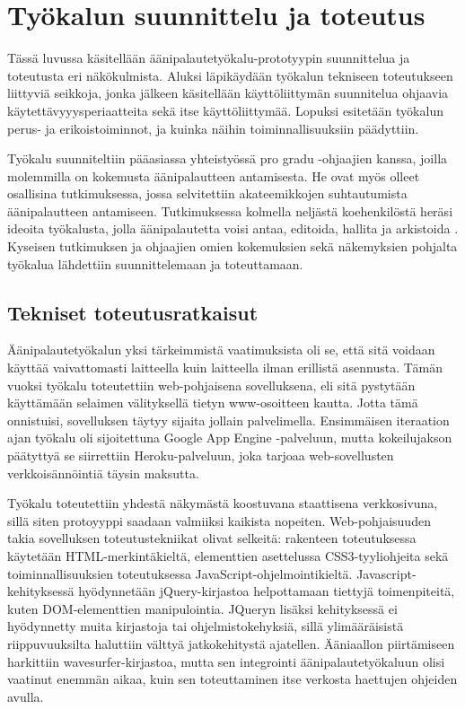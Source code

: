 \documentclass[utf8]{gradu3}
\begin{document}
\chapter{Työkalun suunnittelu ja toteutus}

Tässä luvussa käsitellään äänipalautetyökalu-prototyypin suunnittelua ja toteutusta eri näkökulmista. Aluksi läpikäydään työkalun tekniseen toteutukseen liittyviä seikkoja, jonka jälkeen käsitellään käyttöliittymän suunnitelua ohjaavia käytettävyyysperiaatteita sekä itse käyttöliittymää. Lopuksi esitetään työkalun perus- ja erikoistoiminnot, ja kuinka näihin toiminnallisuuksiin päädyttiin.

Työkalu suunniteltiin pääasiassa yhteistyössä pro gradu -ohjaajien kanssa, joilla molemmilla on kokemusta äänipalautteen antamisesta. He ovat myös olleet osallisina tutkimuksessa, jossa selvitettiin akateemikkojen suhtautumista äänipalautteen antamiseen. Tutkimuksessa kolmella neljästä koehenkilöstä heräsi ideoita työkalusta, jolla äänipalautetta voisi antaa, editoida, hallita ja arkistoida \parencite[][]{academics}. Kyseisen tutkimuksen ja ohjaajien omien kokemuksien sekä näkemyksien pohjalta työkalua lähdettiin suunnittelemaan ja toteuttamaan.

\section{Tekniset toteutusratkaisut}

Äänipalautetyökalun yksi tärkeimmistä vaatimuksista oli se, että sitä voidaan käyttää vaivattomasti laitteella kuin laitteella ilman erillistä asennusta. Tämän vuoksi työkalu toteutettiin web-pohjaisena sovelluksena, eli sitä pystytään käyttämään selaimen välityksellä tietyn www-osoitteen kautta. Jotta tämä onnistuisi, sovelluksen täytyy sijaita jollain palvelimella. Ensimmäisen iteraation ajan työkalu oli sijoitettuna Google App Engine -palveluun, mutta kokeilujakson päätyttyä se siirrettiin Heroku-palveluun, joka tarjoaa web-sovellusten verkkoisännöintiä täysin maksutta. 

Työkalu toteutettiin yhdestä näkymästä koostuvana staattisena verkkosivuna, sillä siten protoyyppi saadaan valmiiksi kaikista nopeiten. Web-pohjaisuuden takia sovelluksen toteutustekniikat olivat selkeitä: rakenteen toteutuksessa käytetään HTML-merkintäkieltä, elementtien asettelussa CSS3-tyyliohjeita sekä toiminnallisuuksien toteutuksessa JavaScript-ohjelmointikieltä. Javascript-kehityksessä hyödynnetään jQuery-kirjastoa helpottamaan tiettyjä toimenpiteitä, kuten DOM-elementtien manipulointia. JQueryn lisäksi kehityksessä ei hyödynnetty muita kirjastoja tai ohjelmistokehyksiä, sillä ylimääräisistä riippuvuuksilta haluttiin välttyä jatkokehitystä ajatellen. Ääniaallon piirtämiseen harkittiin wavesurfer-kirjastoa, mutta sen integrointi äänipalautetyökaluun olisi vaatinut enemmän aikaa, kuin sen toteuttaminen itse verkosta haettujen ohjeiden avulla.
\end{document}
